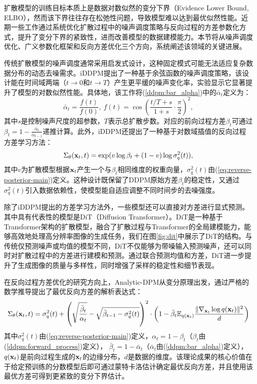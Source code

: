 \documentclass[11pt,a4paper,UTF8]{ctexart}
\begin{document}
扩散模型的训练目标本质上是数据对数似然的变分下界（Evidence Lower Bound, ELBO），然而该下界往往存在松弛性问题，导致模型难以达到最优似然性能。近期一些工作通过系统优化扩散过程中的噪声调度策略与反向过程的方差参数化方式，提升了变分下界的紧致性，进而改善模型的数据建模能力。本节将从噪声调度优化、广义参数化框架和反向方差优化三个方向，系统阐述该领域的关键进展。

传统扩散模型的噪声调度通常采用启发式设计，这种固定模式可能无法适应复杂数据分布的动态去噪需求。iDDPM\cite{nichol2021improved}提出了一种基于余弦函数的噪声调度策略，该设计能在时间域两端（$t\rightarrow 0$和$t\rightarrow T$）产生更平缓的噪声变化率，实验显示它显著提升了模型的对数似然性能。具体地，该工作将(\ref{ddpm:bar_alpha})中的$\bar{\alpha}_t$定义为：
\begin{equation*}
    \bar{\alpha}_t=\frac{f(t)}{f(0)},\ f(t)=\cos\left(\frac{t/T+s}{1+s}\cdot\frac{\pi}{2}\right)^2,
\end{equation*}
其中$s$是控制噪声尺度的超参数，$T$表示总扩散步数。对应的前向过程方差$\beta_t$可通过$\beta_t=1-\frac{\bar{\alpha}_t}{\bar{\alpha}_{t-1}}$递推计算。此外，iDDPM还提出了一种基于对数域插值的反向过程方差学习方法：
\begin{equation*}
    \Sigma_\theta(\mathbf{x}_t,t)=\exp (v\log\beta_t + (1-v)\log \sigma_q^2(t)),
\end{equation*}
其中$v$为扩散模型根据$\mathbf{x}_t$产生一个与$\beta_t$相同维度的权重向量，$\sigma_q^2(t)$由(\ref{eq:reverse-posterior-main})定义。这种设计既保留了DDPM原始方差$\beta_t$的稳定性，又通过$\sigma_q^2(t)$引入数据依赖性，使模型能自适应调整不同时间步的去噪强度。

除了iDDPM提出的方差学习方法外，一些模型还可以直接对方差进行显式预测。其中具有代表性的模型是DiT（Diffusion Transformer）\cite{peebles2022scalable}。DiT是一种基于Transformer架构的扩散模型，融合了扩散过程与Transformer的全局建模能力，能够高效地处理高分辨率图像的生成任务，我们在图\ref{fig:dit}中展示了DiT的结构。与传统仅预测噪声或均值的模型不同，DiT不仅能够为带噪输入预测噪声，还可以同时对扩散过程中的方差进行建模和预测。通过联合预测均值和方差，DiT进一步提升了生成图像的质量与多样性，同时增强了采样的稳定性和细节表现。

在反向过程方差优化的研究方向上，Analytic-DPM\cite{bao2021analytic}从变分原理出发，通过严格的数学推导提出了最优反向方差的解析表达式：
\begin{equation*}
    \Sigma_\theta(\mathbf{x}_t,t)=\sigma_q^2(t) + \left(\sqrt{\frac{\bar{\beta}_t}{\alpha_t}} -\sqrt{\bar{\beta}_{t-1}-\sigma_q^2(t)} \right)^2\cdot \left(1-\bar{\beta}_t \mathbb{E}_{q(\mathbf{x}_t)}\frac{\|\nabla_{\mathbf{x}_t}\log q(\mathbf{x}_t) \|^2}{d} \right)
\end{equation*}
其中$\sigma_q^2(t)$由(\ref{eq:reverse-posterior-main})定义，$\alpha_t=1-\beta_t$（$\beta_t$由(\ref{ddpm:forward_process})定义），
$\bar{\beta}_t=1-\bar{\alpha}_t$（$\bar{\alpha}_t$由(\ref{ddpm:bar_alpha})定义），$q(\mathbf{x}_t)$是前向过程生成的$\mathbf{x}_t$的边缘分布，$d$是数据的维度。该理论成果的核心价值在于给定预训练的分数模型后即可通过蒙特卡洛估计确定最优反向方差，并且使用该最优方差可得到更紧致的变分下界估计。
\end{document}
